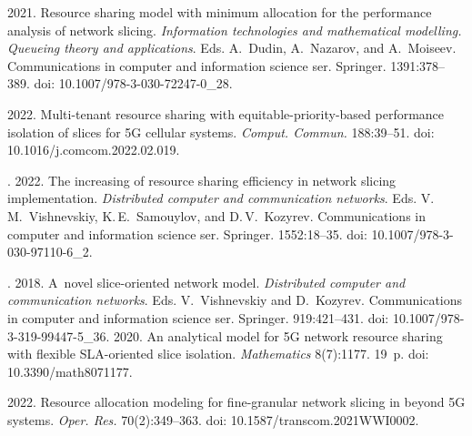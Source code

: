 \vspace*{-1pt}

  \begin{multicols}{2}

\renewcommand{\bibname}{\protect\rmfamily References}

{\small\frenchspacing
 {%
 \begin{thebibliography}{99}

\vspace*{-2pt}

   2021. Resource sharing model 
with minimum allocation for the performance analysis of network slicing. 
\textit{Information technologies and mathematical modelling. Queueing theory and 
applications}. Eds. A.~Dudin, A.~Nazarov, and A.~Moiseev. Communications in 
computer and information science ser. Springer. 1391:378--389.  
doi: 10.1007/978-3-030-72247-0\_28.

   2022. Multi-tenant resource sharing with equitable-priority-based 
performance isolation of slices for 5G cellular systems. \textit{Comput. 
Commun.} 188:39--51. doi: 10.1016/j.comcom.2022.02.019.

  . 2022. The increasing of resource sharing efficiency in network 
slicing implementation. \textit{Distributed computer and communication networks}. 
Eds. V.\,M.~Vishnevskiy, K.\,E.~Samouylov, and D.\,V.~Kozyrev. Communications 
in computer and information science ser. Springer. 1552:18--35.  
doi: 10.1007/978-3-030-97110-6\_2.

  . 
2018. A~novel slice-oriented network model. \textit{Distributed computer and 
communication networks}. Eds. V.~Vishnevskiy and D.~Kozyrev. Communications 
in computer and information science ser. Springer. 919:421--431.  
doi: 10.1007/978-3-319-99447-5\_36.
   2020. An 
analytical model for 5G network resource sharing with flexible SLA-oriented slice 
isolation. \textit{Mathematics} 8(7):1177. 19~p. doi: 10.3390/math8071177.

   2022. Resource allocation modeling for 
fine-granular network slicing in beyond 5G systems. \textit{Oper. Res.} 
70(2):349--363. doi: 10.1587/transcom.2021WWI0002.



\end{thebibliography}}}
\end{multicols}
